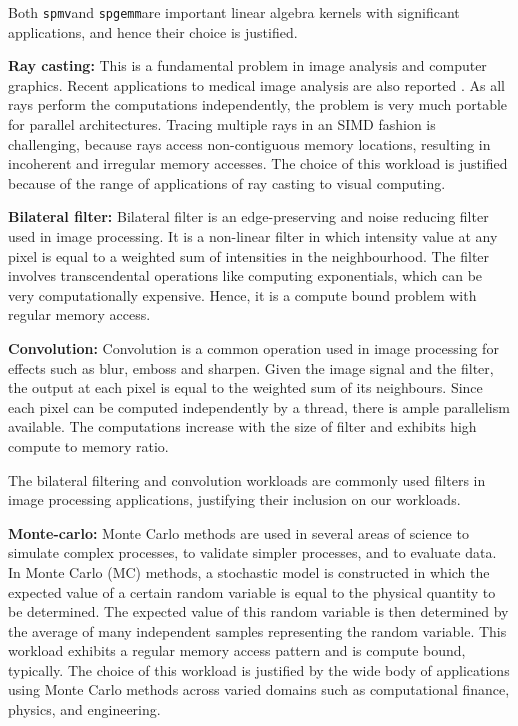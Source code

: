 \documentclass[11pt]{article}
\newcommand{\ignore}[1] {}
\newcommand{\sgemm} {{\tt spgemm}}
\newcommand{\spmv} {{\tt spmv}}
\begin{document}
Both \spmv and \sgemm are important linear algebra kernels with
significant applications, and hence their choice is justified.

{\bf Ray casting: } This is a fundamental problem in image analysis and
computer graphics. Recent applications to medical image analysis are also
reported \cite{rcmed}. As all rays perform the computations independently, the problem is very much portable for parallel architectures. 
Tracing multiple rays in an SIMD fashion is challenging, because rays access non-contiguous
memory locations, resulting in incoherent and irregular memory accesses. 
The choice of this workload is justified because of the range of
applications of ray casting to visual computing.


\ignore {
\item FFT : Fast Fourier Transform, or FFT in short, is a fundamental image
processing primitive with applications to many fields such as digital
signal processing, engineering, astronomy, and the like. Given its
importance, the FFT workload is often used as a benchmark program in
performance analysis of parallel computers and the high performance
computing community. 
}


{\bf Bilateral filter: } Bilateral filter is an edge-preserving and
noise reducing filter used in image processing. It is a non-linear filter
in which intensity value at any pixel is equal to a weighted sum of
intensities in the neighbourhood. The
filter involves transcendental operations like computing exponentials,
which can be very computationally expensive. Hence, it is a compute bound
problem with regular memory access. 

{\bf Convolution: } Convolution is a common operation used in image
processing for effects such as blur, emboss and sharpen. Given the image
signal and the filter, the output at each pixel is equal to the weighted
sum of its neighbours. Since each pixel can be computed independently by a thread,
there is ample parallelism available. The computations increase with the
size of filter and exhibits high compute to memory ratio.


The bilateral filtering and convolution workloads are commonly used
filters in image processing applications, justifying their inclusion on
our workloads.

{\bf Monte-carlo: } Monte Carlo methods are used in several areas of science to
simulate complex processes, to validate simpler processes, and
to evaluate data. In Monte Carlo (MC) methods, a stochastic
model is constructed in which the expected value of a certain
random variable is equal to the physical quantity to be
determined. The expected value of this random variable is then
determined by the average of many independent samples representing
the random variable. This workload exhibits a regular memory access pattern 
and is compute bound, typically. The choice of this workload is justified by the wide body of
applications using Monte Carlo methods across varied domains such as
computational finance, physics, and engineering.
\end{document}
